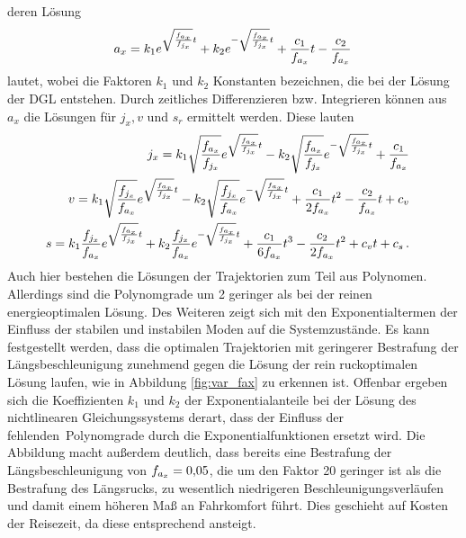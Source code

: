 deren Lösung
\begin{equation}
a_x = k_1e^{\sqrt{\frac{f_{a_x}}{f_{j_x}}}t} + k_2e^{-\sqrt{\frac{f_{a_x}}{f_{j_x}}}t} + \frac{c_1}{f_{a_x}}t - \frac{c_2}{f_{a_x}} \, \label{eq:DGL_ax_Lösung}
\end{equation}
lautet, wobei die Faktoren $k_1$ und $k_2$ Konstanten bezeichnen, die bei der Lösung der \gls{DGL} entstehen. Durch zeitliches Differenzieren bzw. Integrieren können aus $a_x$ die Lösungen für $j_x, v$ und $s_r$ ermittelt werden. Diese lauten
\begin{align}
\begin{split}
j_x &= k_1\sqrt{\frac{f_{a_x}}{f_{j_x}}}e^{\sqrt{\frac{f_{a_x}}{f_{j_x}}}t} - k_2\sqrt{\frac{f_{a_x}}{f_{j_x}}}e^{-\sqrt{\frac{f_{a_x}}{f_{j_x}}}t} + \frac{c_1}{f_{a_x}} \label{eq:DGL_jx_Lösung}
\end{split}
\\
\begin{split}
v &= k_1\sqrt{\frac{f_{j_x}}{f_{a_x}}}e^{\sqrt{\frac{f_{a_x}}{f_{j_x}}}t} - k_2\sqrt{\frac{f_{j_x}}{f_{a_x}}}e^{-\sqrt{\frac{f_{a_x}}{f_{j_x}}}t} + \frac{c_1}{2f_{a_x}}t^2 - \frac{c_2}{f_{a_x}}t + c_v
\end{split}
\\
\begin{split}
s &= k_1\frac{f_{j_x}}{f_{a_x}}e^{\sqrt{\frac{f_{a_x}}{f_{j_x}}}t} + k_2\frac{f_{j_x}}{f_{a_x}}e^{-\sqrt{\frac{f_{a_x}}{f_{j_x}}}t} + \frac{c_1}{6f_{a_x}}t^3 - \frac{c_2}{2f_{a_x}}t^2 + c_vt + c_s \,.
\end{split}
\end{align}
Auch hier bestehen die Lösungen der Trajektorien zum Teil aus Polynomen. Allerdings sind die Polynomgrade um 2 geringer als bei der reinen energieoptimalen Lösung. Des Weiteren zeigt sich mit den Exponentialtermen der Einfluss der stabilen und instabilen Moden auf die Systemzustände. Es kann festgestellt werden, dass die optimalen Trajektorien mit geringerer Bestrafung der Längsbeschleunigung zunehmend gegen die Lösung der rein ruckoptimalen Lösung laufen, wie in Abbildung \ref{fig:var_fax} zu erkennen ist. Offenbar ergeben sich die Koeffizienten $k_1$ und $k_2$ der Exponentialanteile bei der Lösung des nichtlinearen Gleichungssystems derart, dass der Einfluss der \glqq fehlenden\grqq~Polynomgrade durch die Exponentialfunktionen ersetzt wird. Die Abbildung macht außerdem deutlich, dass bereits eine Bestrafung der Längsbeschleunigung von $f_{a_x} = 0{,}05$, die um den Faktor 20 geringer ist als die Bestrafung des Längsrucks, zu wesentlich niedrigeren Beschleunigungsverläufen und damit einem höheren Maß an Fahrkomfort führt. Dies geschieht auf Kosten der Reisezeit, da diese entsprechend ansteigt. 
